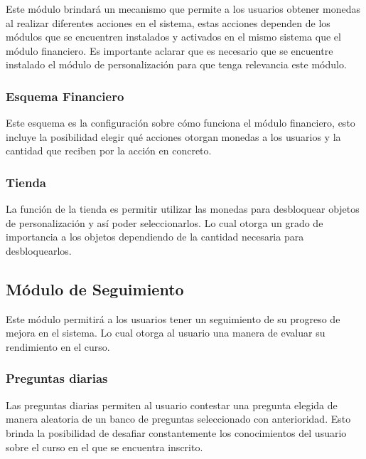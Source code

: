 Este módulo brindará un mecanismo que permite a los usuarios obtener monedas al realizar diferentes acciones en el sistema, estas acciones dependen
de los módulos que se encuentren instalados y activados en el mismo sistema que el módulo financiero. Es importante aclarar que es necesario que se
encuentre instalado el módulo de personalización para que tenga relevancia este módulo.

\subsubsection{Esquema Financiero}

Este esquema es la configuración sobre cómo funciona el módulo financiero, esto incluye la posibilidad elegir qué acciones otorgan monedas a los usuarios
y la cantidad que reciben por la acción en concreto.

\subsubsection{Tienda}

La función de la tienda es permitir utilizar las monedas para desbloquear objetos de personalización y así poder seleccionarlos. Lo cual otorga un grado de importancia a los objetos dependiendo de la cantidad necesaria para desbloquearlos.


\subsection{Módulo de Seguimiento}

Este módulo permitirá a los usuarios tener un seguimiento de su progreso de mejora en el sistema. Lo cual otorga al usuario una manera de evaluar su rendimiento en el curso.

\subsubsection{Preguntas diarias}

Las preguntas diarias permiten al usuario contestar una pregunta elegida de manera aleatoria de un banco de preguntas seleccionado con anterioridad. Esto brinda la posibilidad de desafiar constantemente los conocimientos del usuario sobre el curso en el que se encuentra inscrito.

